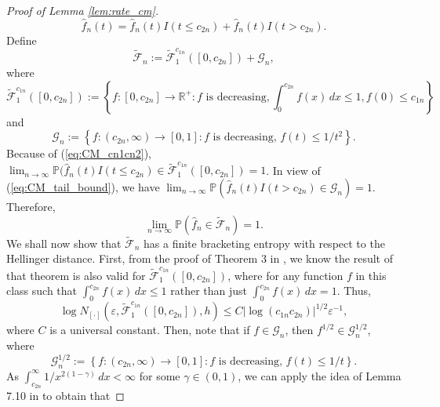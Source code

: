 \documentclass[12pt,letterpaper, twoside, openany]{article}
\theoremstyle{plain}
\begin{document}
\begin{proof}[Proof of Lemma \ref{lem:rate_cm}]
\begin{equation*}
	\hat{f}_n(t) = \hat{f}_n(t) I(t \leq c_{2n}) + \hat{f}_n(t) I(t > c_{2n}).
\end{equation*}
Define 
\begin{equation*}
	\tilde{\mathcal{F}}_n := \tilde{\mathcal{F}}^{c_{1n}}_1([0,c_{2n}]) + \mathcal{G}_{n},
\end{equation*}
where
\begin{equation*}
	\tilde{\mathcal{F}}^{c_{1n}}_1([0, c_{2n}]) := \left\{ f :[0, c_{2n}] \rightarrow \mathbb{R}^+ : \text{$f$ is decreasing}, \int^{c_{2n}}_0 f(x) \, dx \leq 1,  f(0) \leq c_{1n} \right \}
\end{equation*}
and 
\begin{equation*}
	\mathcal{G}_n:= \left\{ f : (c_{2n}, \infty) \rightarrow [0, 1] : \text{$f$ is decreasing, } f(t) \leq 1/t^2  \right\}.
\end{equation*}
Because of (\ref{eq:CM_cn1cn2}), $\lim_{n \rightarrow \infty} \mathbb{P}(\hat{f}_n(t) I(t \leq c_{2n}) \in \tilde{\mathcal{F}}^{c_{1n}}_1([0, c_{2n}]) = 1$. In view of (\ref{eq:CM_tail_bound}), we have
$\lim_{n \rightarrow \infty}	\mathbb{P}(\hat{f}_n(t) I(t > c_{2n}) \in \mathcal{G}_n) = 1$.
Therefore, 
\begin{equation}\label{eq:CM_fhat_in_tildeFn}
	\lim_{n \rightarrow \infty}	\mathbb{P}(\hat{f}_n \in \tilde{\mathcal{F}}_n) = 1.	
\end{equation}
We shall now show that $\tilde{\mathcal{F}}_n$ has a finite bracketing entropy with respect to the Hellinger distance. First, from the proof of Theorem 3 in \cite{gao2009rate}, we know the result of that theorem is also valid for $\tilde{\mathcal{F}}^{c_{1n}}_1([0, c_{2n}])$, where for any function $f$ in this class such that $\int^{c_{2n}}_0 f(x)\, dx \leq 1$ rather than just $\int^{c_{2n}}_0 f(x) \, dx = 1$. Thus,
\begin{equation}\label{eq:CM_entropy_1}
	\log N_{[\cdot]}(\varepsilon, \tilde{\mathcal{F}}^{c_{1n}}_1([0, c_{2n}]), h) \leq C | \log (c_{1n} c_{2n})|^{1/2} \varepsilon^{-1},
\end{equation}
where $C$ is a universal constant. Then, note that if $f \in \mathcal{G}_n$, then $f^{1/2} \in \mathcal{G}^{1/2}_n$, where
\begin{equation*}
	\mathcal{G}^{1/2}_n:= \left\{ f : (c_{2n}, \infty) \rightarrow [0, 1] : \text{$f$ is decreasing, } f(t) \leq 1/t  \right\}.
\end{equation*}
As $\int^\infty_{c_{2n}} 1/x^{2(1-\gamma)} \, dx < \infty$ for some $\gamma \in (0, 1)$, we can apply the idea of Lemma 7.10 in \cite{van2000empirical} to obtain that

\end{proof}
\end{document}

